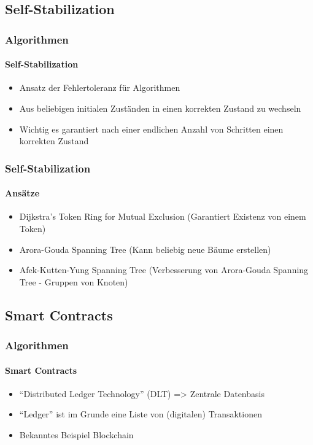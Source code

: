 \subsection{Self-Stabilization}
\begin{frame}
  \frametitle{Algorithmen}
  \framesubtitle{Self-Stabilization}
  \begin{itemize}
    \item Ansatz der Fehlertoleranz für Algorithmen
    \item Aus beliebigen initialen Zuständen in einen korrekten Zustand zu wechseln
    \item Wichtig es garantiert nach einer endlichen Anzahl von Schritten einen korrekten Zustand
  \end{itemize}
\end{frame}

\begin{frame}
  \frametitle{Self-Stabilization}
  \framesubtitle{Ansätze}
  \begin{itemize}
    \item Dijkstra's Token Ring for Mutual Exclusion (Garantiert Existenz von einem Token)
    \item Arora-Gouda Spanning Tree (Kann beliebig neue Bäume erstellen)
    \item Afek-Kutten-Yung Spanning Tree (Verbesserung von  Arora-Gouda Spanning Tree - Gruppen von Knoten)
  \end{itemize}
\end{frame}

\subsection{Smart Contracts}
\begin{frame}
  \frametitle{Algorithmen}
  \framesubtitle{Smart Contracts}
  \begin{itemize}
    \item \enquote{Distributed Ledger Technology} (DLT)  => Zentrale Datenbasis
    \item \enquote{Ledger} ist im Grunde eine Liste von (digitalen) Transaktionen
    \item Bekanntes Beispiel Blockchain
  \end{itemize}
\end{frame}

